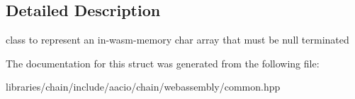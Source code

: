 \subsection{Detailed Description}
class to represent an in-\/wasm-\/memory char array that must be null terminated 

The documentation for this struct was generated from the following file\+:\begin{DoxyCompactItemize}
\item 
libraries/chain/include/aacio/chain/webassembly/common.\+hpp\end{DoxyCompactItemize}
